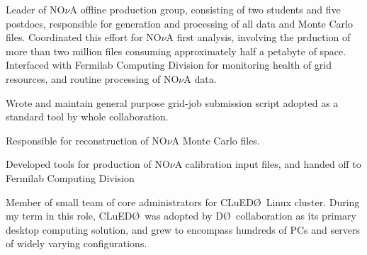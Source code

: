 \documentclass[amsmath,amssymb]{revtex4}
\def\dzero{D\O}
\def\cluedo{CLuED\O}
\begin{document}
\begin{list}{}
            {\setlength{\itemsep}{0.0in}\setlength{\parsep}{0.0in}
             \addtolength{\parskip}{-0.5in}}
\item Leader of NO$\nu$A offline production group, consisting of 
  two students and five postdocs, responsible for generation and
  processing of all data and Monte Carlo files.  Coordinated this
  effort for NO$\nu$A first analysis, involving the prduction of more
  than two million files consuming approximately half a petabyte of
  space. Interfaced with Fermilab Computing Division for monitoring
  health of grid resources, and routine processing of NO$\nu$A data.
\item Wrote and maintain general purpose grid-job submission script adopted
  as a standard tool by whole collaboration.
\item Responsible for reconstruction of NO$\nu$A Monte Carlo files.
\item Developed tools for production of NO$\nu$A calibration input files, and
  handed off to Fermilab Computing Division
\item Member of small team of core administrators for \cluedo\ Linux
  cluster.  During my term in this role, \cluedo~was adopted by
  \dzero~collaboration as its primary desktop computing solution, and
  grew to encompass hundreds of PCs and servers of widely varying
  configurations.
\end{list}

\\
\end{document}
